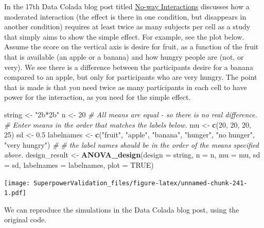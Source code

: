 \documentclass[]{book}
\newenvironment{Shaded}{\begin{snugshade}}{\end{snugshade}}
\newcommand{\CommentTok}[1]{\textcolor[rgb]{0.56,0.35,0.01}{\textit{#1}}}
\newcommand{\DataTypeTok}[1]{\textcolor[rgb]{0.13,0.29,0.53}{#1}}
\newcommand{\DecValTok}[1]{\textcolor[rgb]{0.00,0.00,0.81}{#1}}
\newcommand{\FloatTok}[1]{\textcolor[rgb]{0.00,0.00,0.81}{#1}}
\newcommand{\KeywordTok}[1]{\textcolor[rgb]{0.13,0.29,0.53}{\textbf{#1}}}
\newcommand{\NormalTok}[1]{#1}
\newcommand{\OtherTok}[1]{\textcolor[rgb]{0.56,0.35,0.01}{#1}}
\newcommand{\StringTok}[1]{\textcolor[rgb]{0.31,0.60,0.02}{#1}}
\begin{document}
In the 17th Data Colada blog post titled \href{http://datacolada.org/17}{No-way Interactions} \citet{simonsohn_2014} discusses how a moderated interaction (the effect is there in one condition, but disappears in another condition) requires at least twice as many subjects per cell as a study that simply aims to show the simple effect. For example, see the plot below. Assume the score on the vertical axis is desire for fruit, as a function of the fruit that is available (an apple or a banana) and how hungry people are (not, or very). We see there is a difference between the participants desire for a banana compared to an apple, but only for participants who are very hungry. The point that is made is that you need twice as many participants in each cell to have power for the interaction, as you need for the simple effect.

\begin{Shaded}
\begin{Highlighting}[]
\NormalTok{string <-}\StringTok{ "2b*2b"}
\NormalTok{n <-}\StringTok{ }\DecValTok{20}
\CommentTok{# All means are equal - so there is no real difference.}
\CommentTok{# Enter means in the order that matches the labels below.}
\NormalTok{mu <-}\StringTok{ }\KeywordTok{c}\NormalTok{(}\DecValTok{20}\NormalTok{, }\DecValTok{20}\NormalTok{, }\DecValTok{20}\NormalTok{, }\DecValTok{25}\NormalTok{) }
\NormalTok{sd <-}\StringTok{ }\FloatTok{0.5}
\NormalTok{labelnames <-}\StringTok{ }\KeywordTok{c}\NormalTok{(}\StringTok{"fruit"}\NormalTok{, }\StringTok{"apple"}\NormalTok{, }\StringTok{"banana"}\NormalTok{, }
                \StringTok{"hunger"}\NormalTok{, }\StringTok{"no hunger"}\NormalTok{, }\StringTok{"very hungry"}\NormalTok{) }\CommentTok{#}
\CommentTok{# the label names should be in the order of the means specified above.}
\NormalTok{design_result <-}\StringTok{ }\KeywordTok{ANOVA_design}\NormalTok{(}\DataTypeTok{design =}\NormalTok{ string,}
                   \DataTypeTok{n =}\NormalTok{ n, }
                   \DataTypeTok{mu =}\NormalTok{ mu, }
                   \DataTypeTok{sd =}\NormalTok{ sd, }
                   \DataTypeTok{labelnames =}\NormalTok{ labelnames,}
                   \DataTypeTok{plot =} \OtherTok{TRUE}\NormalTok{)}
\end{Highlighting}
\end{Shaded}

\texttt{[image: SuperpowerValidation\_files/figure-latex/unnamed-chunk-241-1.pdf]}

We can reproduce the simulations in the Data Colada blog post, using the original code.
\end{document}
